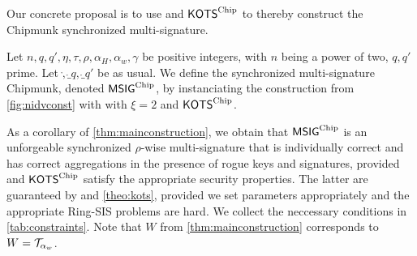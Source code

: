 Our concrete proposal is to use \eprint{$\hvcencoded$}\cameraready{$\hvccamera$} and $\mathsf{KOTS}^{\textup{Chip}}$ to thereby construct the Chipmunk synchronized multi-signature.
\begin{definition}\label{def:actual_chipmunk}
Let $n, q, q', \eta, \tau, \rho, \alpha_H, \alpha_w, \gamma$ be positive integers, with $n$ being a power of two, $q, q'$ prime.
Let $\ring, \ring_q, \ring_{q'}$ be as usual. We define the synchronized multi-signature Chipmunk, denoted $\mathsf{MSIG}^{\textup{Chip}}$, by instanciating the construction from \autoref{fig:nidvconst} with \eprint{$\hvcencoded$}\cameraready{$\hvccamera$} with $\xi=2$ and $\mathsf{KOTS}^{\textup{Chip}}$.
\end{definition}
As a corollary of \autoref{thm:mainconstruction}, we obtain that $\mathsf{MSIG}^{\textup{Chip}}$ is an unforgeable synchronized $\rho$-wise multi-signature that is individually correct and has correct aggregations in the presence of rogue keys and signatures,
provided \eprint{$\hvcencoded$}\cameraready{$\hvccamera$} and $\mathsf{KOTS}^{\textup{Chip}}$ satisfy the appropriate security properties. The latter are guaranteed by  and \autoref{theo:kots}, provided we set parameters appropriately and the appropriate Ring-SIS problems are hard.
We collect the neccessary conditions in \autoref{tab:constraints}. Note that $W$ from \autoref{thm:mainconstruction} corresponds to $W = \mathcal{T}_{\alpha_w}$.

